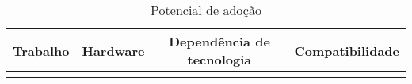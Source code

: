 \begin{table}[]

\centering
\begin{tabular}{|c|c|l|l|}
  \hline
  \textbf{Trabalho} & \textbf{Hardware} & \multicolumn{1}{c|}{\textbf{Dependência de tecnologia}} & \multicolumn{1}{c|}{\textbf{Compatibilidade}} \\ \hline
                    &                   &                                                         &                                               \\ \hline
\end{tabular}
\caption{Potencial de adoção}
\label{tab:adocao}
\end{table}
